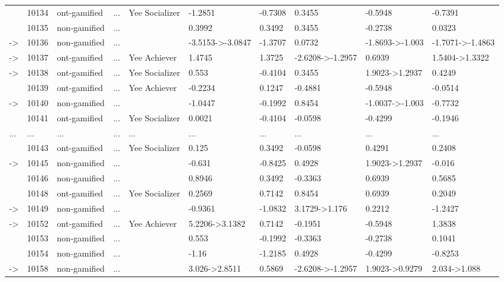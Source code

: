 \documentclass[6pt,a4paper]{article}
\begin{document}
{\begin{longtable}{llllllllll}
&10134&ont-gamified&...&Yee Socializer&-1.2851&-0.7308&0.3455&-0.5948&-0.7391\tabularnewline
&10135&non-gamified&...&&0.3992&0.3492&0.3455&-0.2738&0.0323\tabularnewline
-\textgreater &10136&non-gamified&...&&-3.5153-\textgreater -3.0847&-1.3707&0.0732&-1.8693-\textgreater -1.003&-1.7071-\textgreater -1.4863\tabularnewline
-\textgreater &10137&ont-gamified&...&Yee Achiever&1.4745&1.3725&-2.6208-\textgreater -1.2957&0.6939&1.5404-\textgreater 1.3322\tabularnewline
-\textgreater &10138&ont-gamified&...&Yee Socializer&0.553&-0.4104&0.3455&1.9023-\textgreater 1.2937&0.4249\tabularnewline
&10139&ont-gamified&...&Yee Achiever&-0.2234&0.1247&-0.4881&-0.5948&-0.0514\tabularnewline
-\textgreater &10140&non-gamified&...&&-1.0447&-0.1992&0.8454&-1.0037-\textgreater -1.003&-0.7732\tabularnewline
&10141&ont-gamified&...&Yee Socializer&0.0021&-0.4104&-0.0598&-0.4299&-0.1946\tabularnewline
...&...&...&...&...&...&...&...&...&...\tabularnewline
&10143&ont-gamified&...&Yee Socializer&0.125&0.3492&-0.0598&0.4291&0.2408\tabularnewline
-\textgreater &10145&non-gamified&...&&-0.631&-0.8425&0.4928&1.9023-\textgreater 1.2937&-0.016\tabularnewline
&10146&non-gamified&...&&0.8946&0.3492&-0.3363&0.6939&0.5685\tabularnewline
&10148&ont-gamified&...&Yee Socializer&0.2569&0.7142&0.8454&0.6939&0.2049\tabularnewline
-\textgreater &10149&non-gamified&...&&-0.9361&-1.0832&3.1729-\textgreater 1.176&0.2212&-1.2427\tabularnewline
-\textgreater &10152&ont-gamified&...&Yee Achiever&5.2206-\textgreater 3.1382&0.7142&-0.1951&-0.5948&1.3838\tabularnewline
&10153&non-gamified&...&&0.553&-0.1992&-0.3363&-0.2738&0.1041\tabularnewline
&10154&non-gamified&...&&-1.16&-1.2185&0.4928&-0.4299&-0.8253\tabularnewline
-\textgreater &10158&non-gamified&...&&3.026-\textgreater 2.8511&0.5869&-2.6208-\textgreater -1.2957&1.9023-\textgreater 0.9279&2.034-\textgreater 1.088\tabularnewline
\hline
\end{longtable}}
\end{document}
